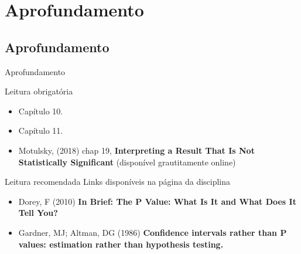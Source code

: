 \documentclass{beamer}
\begin{document}
\section{Aprofundamento}

\subsection{Aprofundamento}

\begin{frame}{\scriptsize Aprofundamento}
  \begin{block}{Leitura obrigatória}
    \footnotesize
    \begin{itemize}
      \footnotesize
    \item Capítulo 10.
    \item Capítulo 11.
    \item {\scriptsize Motulsky, (2018) chap 19, {\bf Interpreting a Result That Is Not Statistically Significant} ({\tiny disponível grautitamente online})}
    \end{itemize}
  \end{block}
  \begin{block}{Leitura recomendada}
    \scriptsize
    Links disponíveis na página da disciplina
    \begin{itemize}
    \tiny
    \item Dorey, F (2010) {\bf In Brief: The P Value: What Is It and What Does It Tell You?}
    \item Gardner, MJ; Altman, DG (1986) {\bf Confidence intervals rather than P values: estimation rather than hypothesis testing.}
    \end{itemize}
  \end{block}
\end{frame}
\end{document}
